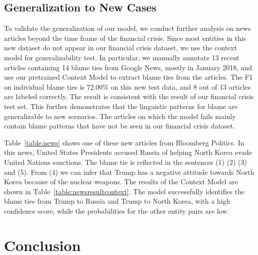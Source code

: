 \documentclass[letterpaper]{article} %
\begin{document}
\subsection{Generalization to New Cases}

To validate the generalization of our model, we conduct further analysis on news articles beyond the time frame of the financial crisis. Since most entities in this new dataset do not appear in our financial crisis dataset, we use the context model for generalizability test. In particular, we manually annotate 13 recent articles containing 14 blame ties from Google News, mostly in January 2018, and use our pretrained Context Model to extract blame ties from the articles. The F1 on individual blame ties is 72.00\% on this new test data, and 8 out of 13 articles are labeled correctly. The result is consistent with the result of our financial crisis test set. This further demonstrates that the linguistic patterns for blame are generalizable to new scenarios. The articles on which the model fails mainly contain blame patterns that have not be seen in our financial crisis dataset.

Table~\ref{table:news} shows one of these new articles from Bloomberg Politics. In this news, United States Presidents accused Russia of helping North Korea evade United Nations sanctions. The blame tie is reflected in the sentences (1) (2) (3) and (5). From (4) we can infer that Trump has a negative attitude towards North Korea because of the nuclear weapons. The results of the Context Model are shown in Table~\ref{table:newsresultcontext}. The model successfully identifies the blame ties from Trump to Russia and Trump to North Korea, with a high confidence score, while the probabilities for the other entity pairs are low.

\section{Conclusion}
\end{document}
